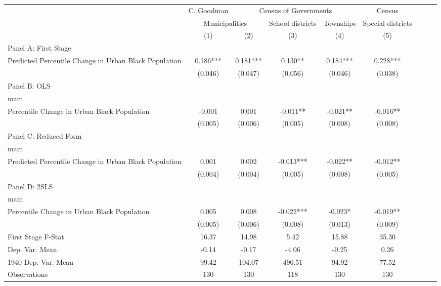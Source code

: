  \begin{tabular}{l*{8}{c}} \toprule
&\multicolumn{1}{c}{C. Goodman}&\multicolumn{3}{c}{Census of Governments}&\multicolumn{1}{c}{Census}\\\cmidrule(lr){2-2}\cmidrule(lr){3-5}\cmidrule(lr){6-6}
&\multicolumn{2}{c}{Municipalities}&\multicolumn{1}{c}{School districts}&\multicolumn{1}{c}{Townships}&\multicolumn{1}{c}{Special districts}&\\\cmidrule(lr){2-3}\cmidrule(lr){4-5}\cmidrule(lr){6-6}
&\multicolumn{1}{c}{(1)}&\multicolumn{1}{c}{(2)}&\multicolumn{1}{c}{(3)}&\multicolumn{1}{c}{(4)}&\multicolumn{1}{c}{(5)}\\
\cmidrule(lr){1-6}
\multicolumn{5}{l}{Panel A: First Stage}\\
\cmidrule(lr){1-6}
Predicted Percentile Change in Urban Black Population&    0.186***&    0.181***&    0.130** &    0.184***&    0.228***\\
                &  (0.046)   &  (0.047)   &  (0.056)   &  (0.046)   &  (0.038)   \\
\cmidrule(lr){1-6}
\multicolumn{5}{l}{Panel B: OLS}\\
\cmidrule(lr){1-6}
main            &            &            &            &            &            \\
Percentile Change in Urban Black Population&   -0.001   &    0.001   &   -0.011** &   -0.021** &   -0.016** \\
                &  (0.005)   &  (0.006)   &  (0.005)   &  (0.008)   &  (0.008)   \\
\cmidrule(lr){1-6}
\multicolumn{5}{l}{Panel C: Reduced Form}\\
\cmidrule(lr){1-6}
main            &            &            &            &            &            \\
Predicted Percentile Change in Urban Black Population&    0.001   &    0.002   &   -0.013***&   -0.022** &   -0.012** \\
                &  (0.004)   &  (0.004)   &  (0.005)   &  (0.008)   &  (0.005)   \\
\cmidrule(lr){1-6}
\multicolumn{5}{l}{Panel D: 2SLS}\\
\cmidrule(lr){1-6}
main            &            &            &            &            &            \\
Percentile Change in Urban Black Population&    0.005   &    0.008   &   -0.022***&   -0.023*  &   -0.019** \\
                &  (0.005)   &  (0.006)   &  (0.008)   &  (0.013)   &  (0.009)   \\
\midrule
First Stage F-Stat&    16.37   &    14.98   &     5.42   &    15.88   &    35.30   \\
Dep. Var. Mean  &    -0.14   &    -0.17   &    -4.06   &    -0.25   &     0.26   \\
1940 Dep. Var. Mean&    99.42   &   104.07   &   496.51   &    94.92   &    77.52   \\
Observations    &      130   &      130   &      118   &      130   &      130   \\
 \bottomrule \end{tabular}
